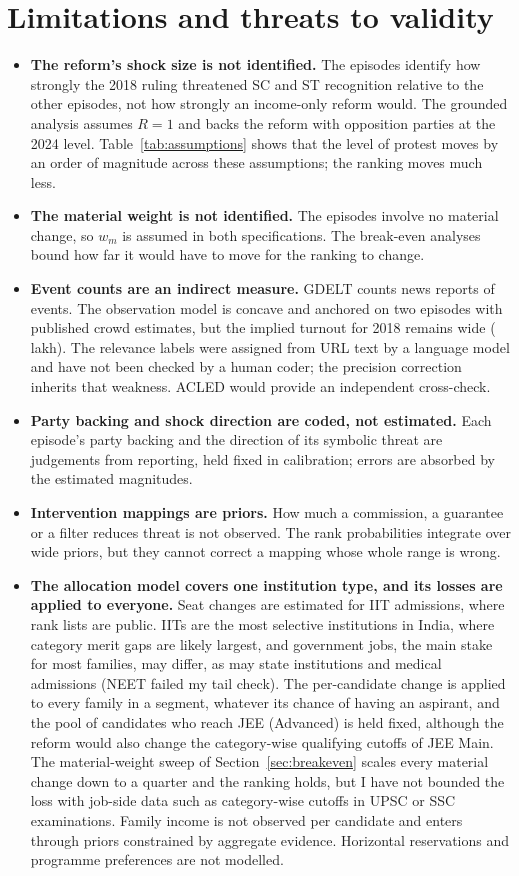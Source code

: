 \documentclass[11pt,a4paper]{article}
\begin{document}
\section{Limitations and threats to validity}
\label{sec:limitations}
\begin{itemize}
\item \textbf{The reform's shock size is not identified.} The episodes identify how strongly the 2018 ruling threatened SC and ST recognition relative to the other episodes, not how strongly an income-only reform would. The grounded analysis assumes $R=1$ and backs the reform with opposition parties at the 2024 level. Table~\ref{tab:assumptions} shows that the level of protest moves by an order of magnitude across these assumptions; the ranking moves much less.
\item \textbf{The material weight is not identified.} The episodes involve no material change, so $w_m$ is assumed in both specifications. The break-even analyses bound how far it would have to move for the ranking to change.
\item \textbf{Event counts are an indirect measure.} GDELT counts news reports of events. The observation model is concave and anchored on two episodes with published crowd estimates, but the implied turnout for 2018 remains wide (\CalibTurnoutTwentyEighteenInterval{} lakh). The relevance labels were assigned from URL text by a language model and have not been checked by a human coder; the precision correction inherits that weakness. ACLED would provide an independent cross-check.
\item \textbf{Party backing and shock direction are coded, not estimated.} Each episode's party backing and the direction of its symbolic threat are judgements from reporting, held fixed in calibration; errors are absorbed by the estimated magnitudes.
\item \textbf{Intervention mappings are priors.} How much a commission, a guarantee or a filter reduces threat is not observed. The rank probabilities integrate over wide priors, but they cannot correct a mapping whose whole range is wrong.
\item \textbf{The allocation model covers one institution type, and its losses are applied to everyone.} Seat changes are estimated for IIT admissions, where rank lists are public. IITs are the most selective institutions in India, where category merit gaps are likely largest, and government jobs, the main stake for most families, may differ, as may state institutions and medical admissions (NEET failed my tail check). The per-candidate change is applied to every family in a segment, whatever its chance of having an aspirant, and the pool of candidates who reach JEE (Advanced) is held fixed, although the reform would also change the category-wise qualifying cutoffs of JEE Main. The material-weight sweep of Section~\ref{sec:breakeven} scales every material change down to a quarter and the ranking holds, but I have not bounded the loss with job-side data such as category-wise cutoffs in UPSC or SSC examinations. Family income is not observed per candidate and enters through priors constrained by aggregate evidence. Horizontal reservations and programme preferences are not modelled.

\end{itemize}
\end{document}
